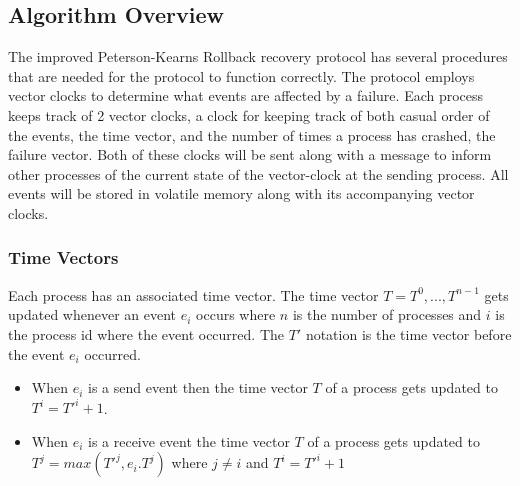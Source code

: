 \documentclass[twocolumn, a4paper,11pt]{article}%
\begin{document}
\subsection{Algorithm Overview}
\par The improved Peterson-Kearns Rollback recovery protocol\cite{van2023optimistic} has several procedures that are needed for the protocol to function correctly. The protocol employs vector clocks to determine what events are affected by a failure. Each process keeps track of 2 vector clocks, a clock for keeping track of both casual order of the events, the time vector, and the number of times a process has crashed, the failure vector.  Both of these clocks will be sent along with a message to inform other processes of the current state of the vector-clock at the sending process. All events will be stored in volatile memory along with its accompanying vector clocks. 

\subsubsection{Time Vectors}
\par Each process has an associated time vector. The time vector \(T= T^{0},...,T^{n-1}\) gets updated whenever an event \(e_{i}\) occurs where \(n\) is the  number of processes and \(i\) is the process id where the event occurred.  The \(T'\) notation is the time vector before the event \(e_{i}\) occurred.
\begin{itemize}
	\item When \(e_{i}\) is a send event then the time vector \(T\) of a process gets updated to \(T^{i} =  T'^{i} + 1\).
	\item When \(e_{i}\) is a receive event  the time vector \(T\) of a process gets updated to \(T^{j} = max(T'^{j}, e_{i}.T^{j})\) where \(j \neq i\) and \(T^{i} = T'^{i} + 1\)
\end{itemize}
\end{document}
